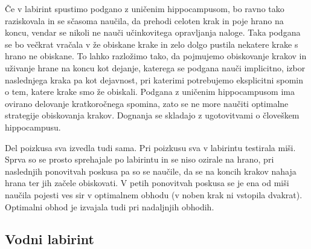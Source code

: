 \documentclass[10pt,a4paper]{article}
\begin{document}
Če v labirint spustimo podgano z uničenim hippocampusom, bo ravno tako raziskovala in se sčasoma naučila, da prehodi celoten krak in poje hrano na koncu, vendar se nikoli ne nauči učinkovitega opravljanja naloge. Taka podgana se bo večkrat vračala v že obiskane krake in zelo dolgo pustila nekatere krake s hrano ne obiskane. To lahko razložimo tako, da pojmujemo obiskovanje krakov in uživanje hrane na koncu kot dejanje, katerega se podgana nauči implicitno, izbor naslednjega kraka pa kot dejavnost, pri katerimi potrebujemo eksplicitni spomin o tem, katere krake smo že obiskali. Podgana z uničenim hippocampusom ima ovirano delovanje kratkoročnega spomina, zato se ne more naučiti optimalne strategije obiskovanja krakov. Dognanja se skladajo z ugotovitvami o človeškem hippocampusu.

Del poizkusa sva izvedla tudi sama. Pri poizkusu sva v labirintu testirala miši. Sprva so se prosto sprehajale po labirintu in se niso ozirale na hrano, pri naslednjih ponovitvah poskusa pa so se naučile, da se na koncih krakov nahaja hrana ter jih začele obiskovati. V petih ponovitvah poskusa se je ena od miši naučila pojesti ves sir v optimalnem obhodu (v noben krak ni vstopila dvakrat). Optimalni obhod je izvajala tudi pri nadaljnjih obhodih.

\subsection{Vodni labirint}
\end{document}
